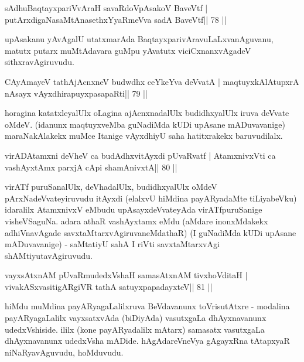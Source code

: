 \begin{shl}
sAdhuBaqtayxpariVvAraH savaRdoVpAsakoV BaveVtf |
putArxdigaNasaMtAnasethxYyaRmeVva sadA BaveVtf\hfill || 78 ||
\end{shl}

\begin{artha}
upAsakanu yAvAgalU utatxmarAda BaqtayxparivAravuLaLxvanAguvanu, matutx putarx muMtAdavara guMpu yAvatutx viciCxnanxvAgadeV sithxravAgiruvudu.
\end{artha} 


\begin{shl}
CAyAmayeV tathA\s jAcnxneV budwdhx ceYkeYva deVvatA |
maqtuyxkAlAtupxrA nAsayx vAyxdhirapuyxpasapaRti\hfill || 79 ||
\end{shl}

\begin{artha}
horagina katatxleyalUlx oLagina ajAcnxnadalUlx budidhxyalUlx iruva  deVvate oMdeV. (idanunx maqtuyxveMba guNadiMda kUDi upAsane mADuvavanige) maraNakAlakekx muMce Itanige vAyxdhiyU saha hatitxrakekx baruvudilalx.
\end{artha}


\begin{shl}
virADAtamxni deVheV ca budAdhxvitAyxdi pUvaRvatf |
AtamxnivxVti ca vashAyxtAmx parxjA cApi shamAnivxtA\hfill || 80 ||
\end{shl}

\begin{artha}
virATf puruSanalUlx, deVhadalUlx, budidhxyalUlx oMdeV  pArxNadeVvateyiruvudu itAyxdi (elalxvU hiMdina payARyadaMte  tiLiyabeVku) idaralilx AtamxnivxV eMbudu upAsayxdeVvateyAda  virATfpuruSanige visheVSaguNa. adara athaR vashAyxtamx eMdu (aMdare  inonxMdakekx adhiVnavAgade savxtaMtarxvAgiruvaneMdathaR) (I guNadiMda kUDi upAsane mADuvavanige) - saMtatiyU sahA I riVti savxtaMtarxvAgi shAMtiyutavAgiruvudu.
\end{artha}

\begin{shl}
vayxsAtxnAM pUvaRmudedxVshaH samasAtxnAM tivxhoVditaH |
vivakASxvasitigARgiVR tathA satuyxpapadayxteV\hfill || 81 ||
\end{shl}

\begin{artha}
hiMdu muMdina payARyagaLalilxruva BeVdavanunx toVrisutAtxre - modalina  payARyagaLalilx vayxsatxvAda (biDiyAda) vasutxgaLa dhAyxnavanunx  udedxVshiside. ililx (kone payARyadalilx mAtarx) samasatx vasutxgaLa  dhAyxnavanunx udedxVsha mADide. hAgAdareVneVya gAgayxRna tAtapxyaR niNaRyavAguvudu, hoMduvudu.
\end{artha}

